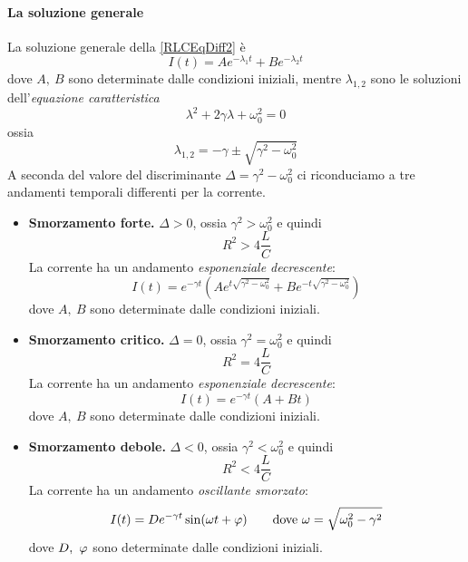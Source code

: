 \paragraph{La soluzione generale}
La soluzione generale della \eqref{RLCEqDiff2} è
\begin{equation}
	I(t)=Ae^{-\lambda_1t}+Be^{-\lambda_2t}
\end{equation}
dove $A,\ B$ sono determinate dalle condizioni iniziali, mentre $\lambda_{1,2}$ sono le soluzioni dell'\textit{equazione caratteristica}
\begin{equation}
	\lambda^2+2\gamma\lambda+\omega^2_0=0
\end{equation}
ossia
\begin{equation}
	\lambda_{1,2}=-\gamma\pm\sqrt{\gamma^2-\omega_0^2}
\end{equation}
A seconda del valore del discriminante $\Delta=\gamma^2-\omega_0^2$ ci riconduciamo a tre andamenti temporali differenti per la corrente.
\begin{itemize}
	\item \textbf{Smorzamento forte.} $\Delta > 0$, ossia $\gamma^2>\omega_0^2$ e quindi
	\begin{equation*}
		R^2>4\frac{L}{C}
	\end{equation*}
	La corrente ha un andamento \textit{esponenziale decrescente}:
	\begin{equation}
		I(t)=e^{-\gamma t}\left(A e^{t\sqrt{\gamma^2-\omega_0^2}}+B e^{-t\sqrt{\gamma^2-\omega_0^2}}\right)
	\end{equation}
	dove $A,\ B$ sono determinate dalle condizioni iniziali.
	\item \textbf{Smorzamento critico.} $\Delta = 0$, ossia $\gamma^2=\omega_0^2$ e quindi
	\begin{equation*}
		R^2=4\frac{L}{C}
	\end{equation*}
	La corrente ha un andamento \textit{esponenziale decrescente}:
	\begin{equation}
		I(t)=e^{-\gamma t}\left(A +Bt\right)
	\end{equation}
	dove $A,\ B$ sono determinate dalle condizioni iniziali.
	\item \textbf{Smorzamento debole.} $\Delta < 0$, ossia $\gamma^2<\omega_0^2$ e quindi
	\begin{equation*}
		R^2<4\frac{L}{C}
	\end{equation*}
	La corrente ha un andamento \textit{oscillante smorzato}:
	\begin{equation}
		I(t)=De^{-\gamma t}\sin(\omega t+\oldphi)\qquad\text{dove}\ \omega=\sqrt{\omega_0^2-\gamma^2}
	\end{equation}
	dove $D,\ \oldphi$ sono determinate dalle condizioni iniziali.
\end{itemize}
